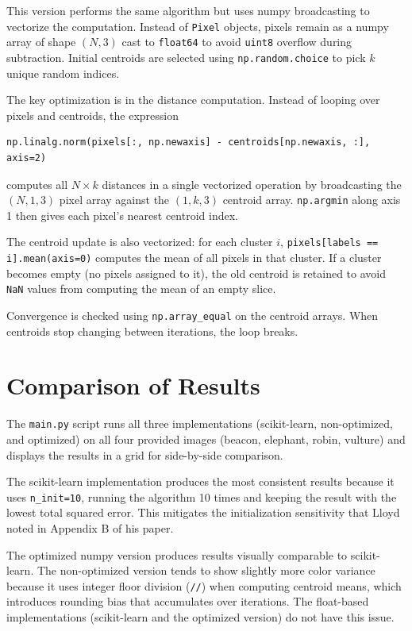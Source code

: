 \documentclass[12pt]{article}
\begin{document}
This version performs the same algorithm but uses numpy broadcasting to
vectorize the computation. Instead of \texttt{Pixel} objects, pixels remain as
a numpy array of shape $(N, 3)$ cast to \texttt{float64} to avoid
\texttt{uint8} overflow during subtraction. Initial centroids are selected
using \texttt{np.random.choice} to pick $k$ unique random indices.

The key optimization is in the distance computation. Instead of looping over
pixels and centroids, the expression
\begin{verbatim}
np.linalg.norm(pixels[:, np.newaxis] - centroids[np.newaxis, :], axis=2)
\end{verbatim}
computes all $N \times k$ distances in a single vectorized operation by
broadcasting the $(N, 1, 3)$ pixel array against the $(1, k, 3)$ centroid
array. \texttt{np.argmin} along axis 1 then gives each pixel's nearest
centroid index.

The centroid update is also vectorized: for each cluster $i$,
\texttt{pixels[labels == i].mean(axis=0)} computes the mean of all pixels in
that cluster. If a cluster becomes empty (no pixels assigned to it), the old
centroid is retained to avoid \texttt{NaN} values from computing the mean of
an empty slice.

Convergence is checked using \texttt{np.array\_equal} on the centroid arrays.
When centroids stop changing between iterations, the loop breaks.

\section{Comparison of Results}

The \texttt{main.py} script runs all three implementations (scikit-learn,
non-optimized, and optimized) on all four provided images (beacon, elephant,
robin, vulture) and displays the results in a grid for side-by-side comparison.

The scikit-learn implementation produces the most consistent results because it
uses \texttt{n\_init=10}, running the algorithm 10 times and keeping the result
with the lowest total squared error. This mitigates the initialization
sensitivity that Lloyd noted in Appendix B of his paper.

The optimized numpy version produces results visually comparable to
scikit-learn. The non-optimized version tends to show slightly more color
variance because it uses integer floor division (\texttt{//}) when computing
centroid means, which introduces rounding bias that accumulates over
iterations. The float-based implementations (scikit-learn and the optimized
version) do not have this issue.
\end{document}
